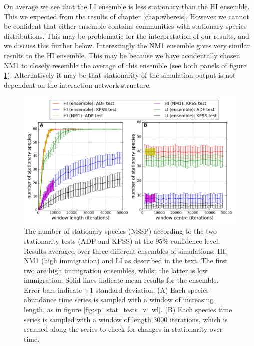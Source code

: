 On average we see that the LI ensemble is less stationary than the HI ensemble. This we expected from the results of chapter \ref{chap:whereis}. However we cannot be confident that either ensemble contains communities with stationary species distributions. This may be problematic for the interpretation of our results, and we discuss this further below. Interestingly the NM1 ensemble gives very similar results to the HI ensemble. This may be because we have accidentally chosen NM1 to closely resemble the average of this ensemble (see both panels of figure \ref{fig:hi_v_li_net7_ensemble}). Alternatively it may be that stationarity of the simulation output is not dependent on the interaction network structure. 


\begin{figure}[h]
	\centering
	\includegraphics[width=1.0\linewidth]{"./chapters/chapter04b/figures/hi_v_li_net7_ensemble"}
    \caption{The number of stationary species (NSSP) according to the two stationarity tests (ADF and KPSS) at the $95\%$ confidence level. Results averaged over three different ensembles of simulations: HI; NM1 (high immigration) and LI as described in the text. The first two are high immigration ensembles, whilst the latter is low immigration. Solid lines indicate mean results for the ensemble. Error bars indicate $\pm 1$ standard deviation. (A) Each species abundance time series is sampled with a window of increasing length, as in figure \ref{fig:sp_stat_tests_v_wl}. (B) Each species time series is sampled with a window of length $3000$ iterations, which is scanned along the series to check for changes in stationarity over time.}    
    \label{fig:hi_v_li_net7_ensemble}
\end{figure}


